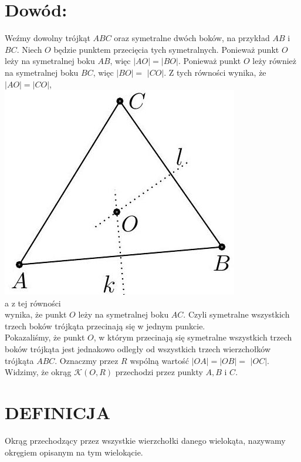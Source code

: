 \documentclass[10pt]{article}
\begin{document}
\section*{Dowód:}
Weźmy dowolny trójkąt \(A B C\) oraz symetralne dwóch boków, na przykład \(A B\) i \(B C\). Niech \(O\) będzie punktem przecięcia tych symetralnych. Ponieważ punkt \(O\) leży na symetralnej boku \(A B\), więc \(|A O|=|B O|\). Ponieważ punkt \(O\) leży również na symetralnej boku \(B C\), więc \(|B O|=\) \(|C O|\). Z tych równości wynika, że \(|A O|=|C O|\),\\
\includegraphics[max width=\textwidth, center]{2024_11_21_71f62bd117d375398909g-155(1)}\\
a z tej równości\\
wynika, że punkt \(O\) leży na symetralnej boku \(A C\). Czyli symetralne wszystkich trzech boków trójkąta przecinają się w jednym punkcie.\\
Pokazaliśmy, że punkt \(O\), w którym przecinają się symetralne wszystkich trzech boków trójkąta jest jednakowo odległy od wszystkich trzech wierzchołków trójkąta \(A B C\). Oznaczmy przez \(R\) wspólną wartość \(|O A|=|O B|=\) \(|O C|\). Widzimy, że okrąg \(\mathcal{K}(O, R)\) przechodzi przez punkty \(A, B\) i \(C\).

\section*{DEFINICJA}
Okrąg przechodzący przez wszystkie wierzchołki danego wielokąta, nazywamy okręgiem opisanym na tym wielokącie.
\end{document}
